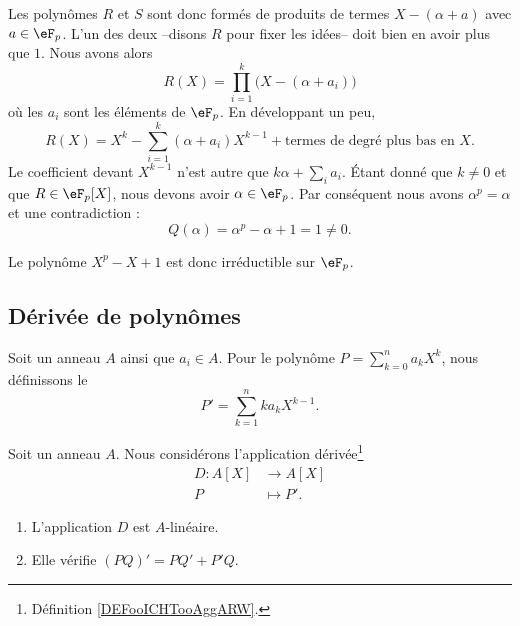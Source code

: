 \begin{example}
	Les polynômes \( R\) et \( S\) sont donc formés de produits de termes \( X-(\alpha+a)\) avec \( a\in \eF_p\). L'un des deux --disons \( R\) pour fixer les idées-- doit bien en avoir plus que \( 1\). Nous avons alors
	\begin{equation}
		R(X)=\prod_{i=1}^{k}\big( X-(\alpha+a_i) \big)
	\end{equation}
	où les \( a_i\) sont les éléments de \( \eF_p\). En développant un peu,
	\begin{equation}
		R(X)=X^k-\sum_{i=1}^k(\alpha+a_i)X^{k-1}+\text{termes de degré plus bas en } X.
	\end{equation}
	Le coefficient devant \( X^{k-1}\) n'est autre que \( k\alpha+\sum_ia_i\). Étant donné que \( k\neq 0\) et que \( R\in \eF_p[X]\), nous devons avoir \( \alpha\in \eF_p\). Par conséquent nous avons \( \alpha^p=\alpha\) et une contradiction :
	\begin{equation}
		Q(\alpha)=\alpha^p-\alpha+1=1\neq 0.
	\end{equation}

	Le polynôme \( X^p-X+1\) est donc irréductible sur \( \eF_p\).
\end{example}


\subsection{Dérivée de polynômes}

\begin{definition}    \label{DEFooICHTooAggARW}
	Soit un anneau \( A\) ainsi que \( a_i\in A\). Pour le polynôme \( P=\sum_{k=0}^na_k X^k\), nous définissons le 
	\begin{equation}
		P'=\sum_{k=1}^nka_kX^{k-1}.
	\end{equation}
\end{definition}

\begin{lemma}        \label{LEMooEFQQooTzDanH}
	Soit un anneau \( A\). Nous considérons l'application dérivée\footnote{Définition \ref{DEFooICHTooAggARW}.}
	\begin{equation}
		\begin{aligned}
			D\colon A[X] & \to A[X]    \\
			P            & \mapsto P'.
		\end{aligned}
	\end{equation}
	\begin{enumerate}
		\item
		      L'application \( D\) est \( A\)-linéaire.
		\item
		      Elle vérifie \( (PQ)'=PQ'+P'Q\).
	\end{enumerate}
\end{lemma}

